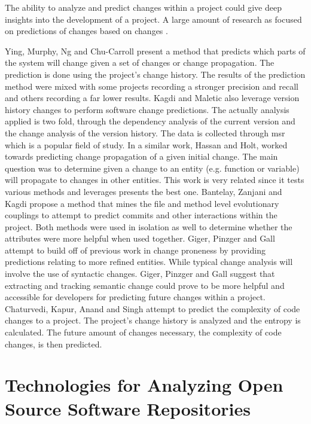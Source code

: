 The ability to analyze and predict changes within a project could give deep insights into the development of a project. A large amount of research as focused on predictions of changes based on changes \cite{Bantelay2013, Chaturvedi2014, Giger2012, Hassan2004, Kagdi2007, ying2004}.

Ying, Murphy, Ng and Chu-Carroll present a method that predicts which parts of the system will change given a set of changes or change propagation\cite{ying2004}. The prediction is done using the project's change history. The results of the prediction method were mixed with some projects recording a stronger precision and recall and others recording a far lower results. Kagdi and Maletic also leverage version history changes to perform software change predictions. The actually analysis applied is two fold, through the dependency analysis of the current version and the change analysis of the version history. The data is collected through \gls{msr} which is a popular field of study. In a similar work, Hassan and Holt, worked towards predicting change propagation of a given initial change. The main question was to determine given a change to an entity (e.g. function or variable) will propagate to changes in other entities. This work is very related since it tests various methods and leverages presents the best one. Bantelay, Zanjani and Kagdi propose a method that mines the file and method level evolutionary couplings to attempt to predict commits and other interactions within the project\cite{Bantelay2013}. Both methods were used in isolation as well to determine whether the attributes were more helpful when used together. Giger, Pinzger and Gall attempt to build off of previous work in change proneness by providing predictions relating to more refined entities\cite{Giger2012}. While typical change analysis will involve the use of syntactic changes. Giger, Pinzger and Gall suggest that extracting and tracking semantic change could prove to be more helpful and accessible for developers for predicting future changes within a project\cite{Giger2012}. Chaturvedi, Kapur, Anand and Singh attempt to predict the complexity of code changes to a project\cite{Chaturvedi2014}. The project's change history is analyzed and the entropy is calculated. The future amount of changes necessary, the complexity of code changes, is then predicted.

\section{Technologies for Analyzing Open Source Software Repositories}

